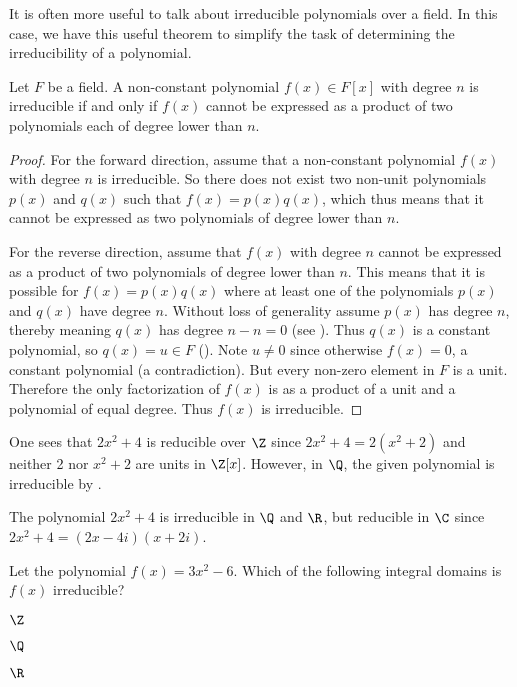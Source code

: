 It is often more useful to talk about irreducible polynomials over a field. In this case, we have this useful theorem to simplify the task of determining the irreducibility of a polynomial.
\begin{theorem}\label{thrm-irreducible-iff-not-expressable-as-product-of-smaller-polynomials}
    Let $F$ be a field. A non-constant polynomial $f(x) \in F[x]$ with degree $n$ is irreducible if and only if $f(x)$ cannot be expressed as a product of two polynomials each of degree lower than $n$.
\end{theorem}
\begin{proof}
    For the forward direction, assume that a non-constant polynomial $f(x)$ with degree $n$ is irreducible. So there does not exist two non-unit polynomials $p(x)$ and $q(x)$ such that $f(x) = p(x)q(x)$, which thus means that it cannot be expressed as two polynomials of degree lower than $n$.

    For the reverse direction, assume that $f(x)$ with degree $n$ cannot be expressed as a product of two polynomials of degree lower than $n$. This means that it is possible for $f(x) = p(x)q(x)$ where at least one of the polynomials $p(x)$ and $q(x)$ have degree $n$. Without loss of generality assume $p(x)$ has degree $n$, thereby meaning $q(x)$ has degree $n - n = 0$ (see ). Thus $q(x)$ is a constant polynomial, so $q(x) = u \in F$ (). Note $u \neq 0$ since otherwise $f(x) = 0$, a constant polynomial (a contradiction). But every non-zero element in $F$ is a unit. Therefore the only factorization of $f(x)$ is as a product of a unit and a polynomial of equal degree. Thus $f(x)$ is irreducible.
\end{proof}

\begin{example}
    One sees that $2x^2 + 4$ is reducible over $\Z$ since $2x^2 + 4 = 2(x^2 + 2)$ and neither 2 nor $x^2 + 2$ are units in $\Z[x]$. However, in $\Q$, the given polynomial is irreducible by .
\end{example}

\begin{example}
    The polynomial $2x^2 + 4$ is irreducible in $\Q$ and $\R$, but reducible in $\C$ since $2x^2 + 4 = (2x-4i)(x+2i)$.
\end{example}

\begin{exercise}
    Let the polynomial $f(x) = 3x^2 - 6$. Which of the following integral domains is $f(x)$ irreducible?
    \begin{partquestions}{\alph*}
        \item $\Z$
        \item $\Q$
        \item $\R$
    \end{partquestions} 
\end{exercise}

